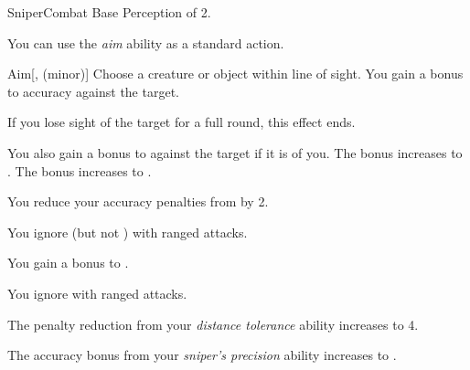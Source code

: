     \begin{feat}{Sniper}{Combat}
        \featpre Base Perception of 2.

         You can use the \textit{aim} ability as a standard action.
        \begin{freeability}{Aim}[,  (minor)]
            Choose a creature or object within line of sight.
            You gain a  bonus to accuracy against the target.

            If you lose sight of the target for a full round, this effect ends.

            \rankline
             You also gain a  bonus to  against the target if it is  of you.
             The  bonus increases to .
             The  bonus increases to .
        \end{freeability}

         You reduce your accuracy penalties from  by 2.

         You ignore  (but not ) with ranged attacks.

         You gain a  bonus to .

         You ignore  with ranged attacks.

         The penalty reduction from your \textit{distance tolerance} ability increases to 4.

         The accuracy bonus from your \textit{sniper's precision} ability increases to .
    \end{feat}

